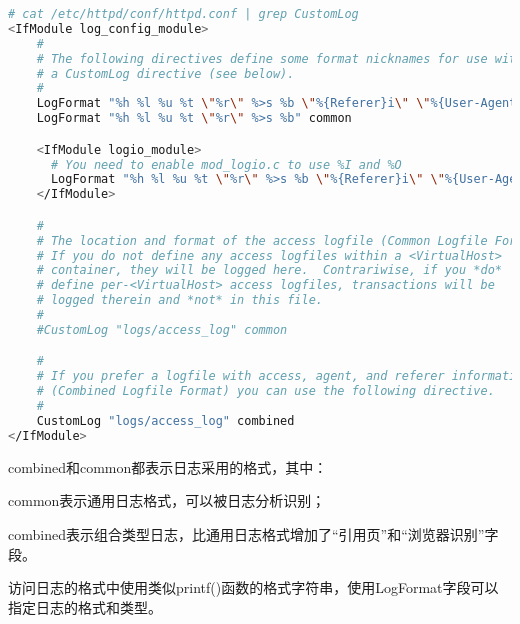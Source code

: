 \begin{lstlisting}[language=bash]
# cat /etc/httpd/conf/httpd.conf | grep CustomLog
<IfModule log_config_module>
    #
    # The following directives define some format nicknames for use with
    # a CustomLog directive (see below).
    #
    LogFormat "%h %l %u %t \"%r\" %>s %b \"%{Referer}i\" \"%{User-Agent}i\"" combined
    LogFormat "%h %l %u %t \"%r\" %>s %b" common

    <IfModule logio_module>
      # You need to enable mod_logio.c to use %I and %O
      LogFormat "%h %l %u %t \"%r\" %>s %b \"%{Referer}i\" \"%{User-Agent}i\" %I %O" combinedio
    </IfModule>

    #
    # The location and format of the access logfile (Common Logfile Format).
    # If you do not define any access logfiles within a <VirtualHost>
    # container, they will be logged here.  Contrariwise, if you *do*
    # define per-<VirtualHost> access logfiles, transactions will be
    # logged therein and *not* in this file.
    #
    #CustomLog "logs/access_log" common

    #
    # If you prefer a logfile with access, agent, and referer information
    # (Combined Logfile Format) you can use the following directive.
    #
    CustomLog "logs/access_log" combined
</IfModule>
\end{lstlisting}


combined和common都表示日志采用的格式，其中：

\begin{compactitem}
\item common表示通用日志格式，可以被日志分析识别；
\item combined表示组合类型日志，比通用日志格式增加了“引用页”和“浏览器识别”字段。
\end{compactitem}

访问日志的格式中使用类似printf()函数的格式字符串，使用LogFormat字段可以指定日志的格式和类型。

